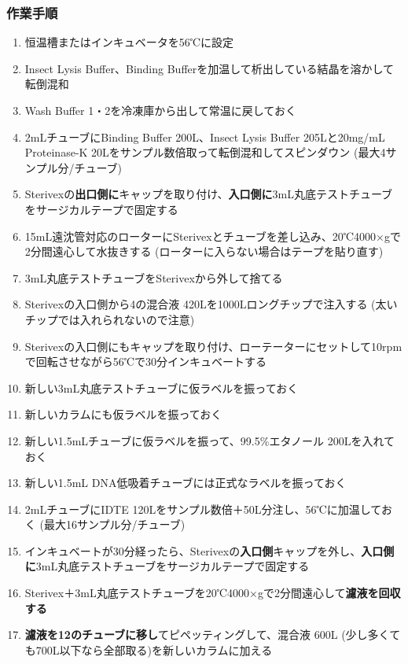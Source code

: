 \documentclass[titlepage,10pt,a4paper,uplatex]{jsbook}
\renewcommand{\textbf}[1]{{\bfseries\sffamily#1}}
\begin{document}
\subsubsection{作業手順}
\begin{enumerate}
\item 恒温槽またはインキュベータを56℃に設定
\item Insect Lysis Buffer、Binding Bufferを加温して析出している結晶を溶かして転倒混和
\item Wash Buffer 1・2を冷凍庫から出して常温に戻しておく
\item 2mLチューブにBinding Buffer 200{\textmu}L、Insect Lysis Buffer 205{\textmu}Lと20mg/mL Proteinase-K 20{\textmu}Lをサンプル数倍取って転倒混和してスピンダウン (最大4サンプル分/チューブ)
\item Sterivexの\textbf{出口側に}キャップを取り付け、\textbf{入口側に}3mL丸底テストチューブをサージカルテープで固定する
\item 15mL遠沈管対応のローターにSterivexとチューブを差し込み、20℃4000×gで2分間遠心して水抜きする (ローターに入らない場合はテープを貼り直す)
\item 3mL丸底テストチューブをSterivexから外して捨てる
\item Sterivexの入口側から4の混合液 420{\textmu}Lを1000{\textmu}Lロングチップで注入する (太いチップでは入れられないので注意)
\item Sterivexの入口側にもキャップを取り付け、ローテーターにセットして10rpmで回転させながら56℃で30分インキュベートする
\item 新しい3mL丸底テストチューブに仮ラベルを振っておく
\item 新しいカラムにも仮ラベルを振っておく
\item 新しい1.5mLチューブに仮ラベルを振って、99.5\%エタノール 200{\textmu}Lを入れておく
\item 新しい1.5mL DNA低吸着チューブには正式なラベルを振っておく
\item 2mLチューブにIDTE 120{\textmu}Lをサンプル数倍＋50{\textmu}L分注し、56℃に加温しておく (最大16サンプル分/チューブ)
\item インキュベートが30分経ったら、Sterivexの\textbf{入口側}キャップを外し、\textbf{入口側に}3mL丸底テストチューブをサージカルテープで固定する
\item Sterivex＋3mL丸底テストチューブを20℃4000×gで2分間遠心して\textbf{濾液を回収する}
\item \textbf{濾液を12のチューブに移し}てピペッティングして、混合液 600{\textmu}L (少し多くても700{\textmu}L以下なら全部取る)を新しいカラムに加える

\end{enumerate}
\end{document}

